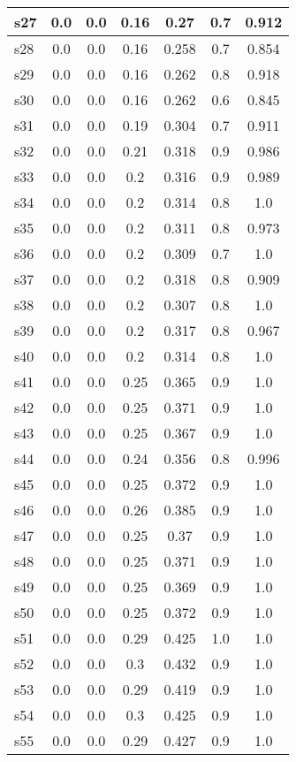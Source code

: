 \documentclass{article}
\begin{document}
\begin{tabular}{|l|c|c|c|c|c|c|}
\hline
s27 &0.0 & 0.0 & 0.16 & 0.27 & 0.7 & 0.912\\
\hline
s28 &0.0 & 0.0 & 0.16 & 0.258 & 0.7 & 0.854\\
\hline
s29 &0.0 & 0.0 & 0.16 & 0.262 & 0.8 & 0.918\\
\hline
s30 &0.0 & 0.0 & 0.16 & 0.262 & 0.6 & 0.845\\
\hline
s31 &0.0 & 0.0 & 0.19 & 0.304 & 0.7 & 0.911\\
\hline
s32 &0.0 & 0.0 & 0.21 & 0.318 & 0.9 & 0.986\\
\hline
s33 &0.0 & 0.0 & 0.2 & 0.316 & 0.9 & 0.989\\
\hline
s34 &0.0 & 0.0 & 0.2 & 0.314 & 0.8 & 1.0\\
\hline
s35 &0.0 & 0.0 & 0.2 & 0.311 & 0.8 & 0.973\\
\hline
s36 &0.0 & 0.0 & 0.2 & 0.309 & 0.7 & 1.0\\
\hline
s37 &0.0 & 0.0 & 0.2 & 0.318 & 0.8 & 0.909\\
\hline
s38 &0.0 & 0.0 & 0.2 & 0.307 & 0.8 & 1.0\\
\hline
s39 &0.0 & 0.0 & 0.2 & 0.317 & 0.8 & 0.967\\
\hline
s40 &0.0 & 0.0 & 0.2 & 0.314 & 0.8 & 1.0\\
\hline
s41 &0.0 & 0.0 & 0.25 & 0.365 & 0.9 & 1.0\\
\hline
s42 &0.0 & 0.0 & 0.25 & 0.371 & 0.9 & 1.0\\
\hline
s43 &0.0 & 0.0 & 0.25 & 0.367 & 0.9 & 1.0\\
\hline
s44 &0.0 & 0.0 & 0.24 & 0.356 & 0.8 & 0.996\\
\hline
s45 &0.0 & 0.0 & 0.25 & 0.372 & 0.9 & 1.0\\
\hline
s46 &0.0 & 0.0 & 0.26 & 0.385 & 0.9 & 1.0\\
\hline
s47 &0.0 & 0.0 & 0.25 & 0.37 & 0.9 & 1.0\\
\hline
s48 &0.0 & 0.0 & 0.25 & 0.371 & 0.9 & 1.0\\
\hline
s49 &0.0 & 0.0 & 0.25 & 0.369 & 0.9 & 1.0\\
\hline
s50 &0.0 & 0.0 & 0.25 & 0.372 & 0.9 & 1.0\\
\hline
s51 &0.0 & 0.0 & 0.29 & 0.425 & 1.0 & 1.0\\
\hline
s52 &0.0 & 0.0 & 0.3 & 0.432 & 0.9 & 1.0\\
\hline
s53 &0.0 & 0.0 & 0.29 & 0.419 & 0.9 & 1.0\\
\hline
s54 &0.0 & 0.0 & 0.3 & 0.425 & 0.9 & 1.0\\
\hline
s55 &0.0 & 0.0 & 0.29 & 0.427 & 0.9 & 1.0\\

\end{tabular}
\end{document}
